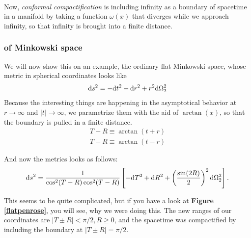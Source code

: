 \parbox{\linewidth}{~}%

Now, \textit{conformal compactification} is including infinity as a boundary of spacetime in a manifold by taking a function $\omega(x)$ that diverges while we approach infinity, so that infinity is brought into a finite distance.

	\subsubsection{of Minkowski space \checkmark}
		
	We will now show this on an example, the ordinary flat Minkowski space, whose metric in spherical coordinates looks like
		\begin{equation}
			\mathrm{d} s^2=- \mathrm{d} t^2+ \mathrm{d} r^2+r^2 \mathrm{d} \Omega^2_2
		\end{equation}
	Because the interesting things are happening in the asymptotical behavior at $r \rightarrow \infty$ and $|t| \rightarrow \infty$, we parametrize them with the aid of $\arctan(x)$, so that the boundary is pulled in a finite distance.
		\begin{equation}
		\begin{split}
			T+R\equiv\arctan(t+r) \\
			T-R\equiv\arctan(t-r)
		\end{split}
		\end{equation}
	
	And now the metrics looks as follows:
		\begin{equation} \label{TRmetric}
			\mathrm{d} s^2=
			\frac{1}{\cos^2(T+R)\cos^2(T-R)}
			\left[- \mathrm{d} T^2+ \mathrm{d} R^2+\left(\frac{\sin(2R)}{2}\right)^2 \mathrm{d} \Omega^2_2 \right].
		\end{equation}	
					
	This seems to be quite complicated, but if you have a look at \textbf{Figure \ref{flatpenrose}}, you will see, why we were doing this. The new ranges of our coordinates are $|T \pm R|< \pi/2, R\geq0$, and the spacetime was compactified by including the boundary at $|T \pm R| = \pi/2$. 
	

